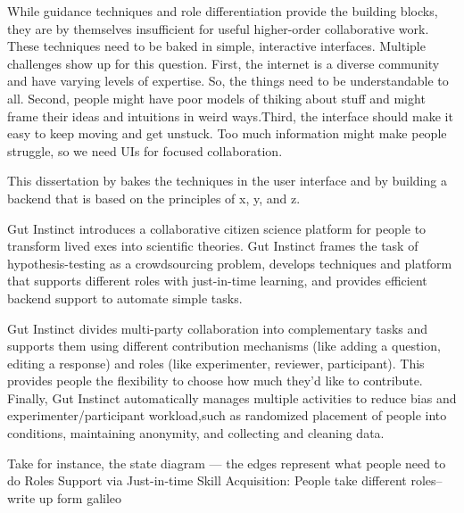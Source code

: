 While guidance techniques and role differentiation provide the building blocks, they are by themselves insufficient for useful higher-order collaborative work. These techniques need to be baked in simple, interactive interfaces. Multiple challenges show up for this question. First, the internet is a diverse community and have varying levels of expertise. So, the things need to be understandable to all. Second, people might have poor models of thiking about stuff and might frame their ideas and intuitions in weird ways.Third, the interface should make it easy to keep moving and get unstuck.  Too much information might make people struggle, so we need UIs for focused collaboration. 

This dissertation by bakes the techniques in the user interface  and by building a backend that is based on the principles of x, y, and z.

Gut Instinct  introduces a collaborative citizen science platform for people to transform lived exes into scientific theories. Gut Instinct frames the task of hypothesis-testing as a crowdsourcing problem, develops techniques and platform that supports different roles with just-in-time learning, and provides efficient backend support to automate simple tasks.

Gut Instinct divides multi-party collaboration into complementary tasks and supports them using different contribution mechanisms (like adding a question, editing a response) and roles (like experimenter, reviewer, participant). This provides people the flexibility to choose how much they’d like to contribute. Finally, Gut Instinct automatically manages multiple activities to reduce 
bias and experimenter/participant workload,such as randomized placement of 
people into conditions, maintaining anonymity, and collecting and cleaning data.


Take for instance, the state diagram — the edges represent what people need to do 
Roles Support via Just-in-time Skill Acquisition:  People take different roles--write up form galileo


